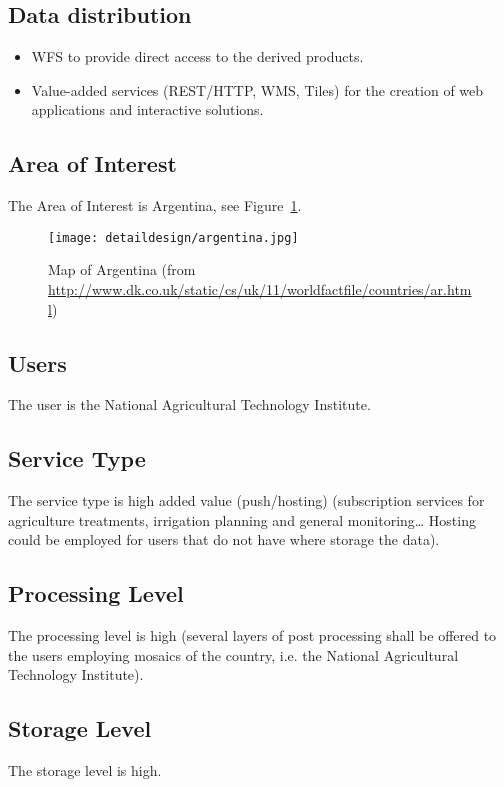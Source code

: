 \subsection{Data distribution}
\begin{itemize}
\item \ac{WFS} to provide direct access to the derived products.
\item Value-added services (REST/HTTP, WMS, Tiles) for the creation of web
  applications and interactive solutions. 
\end{itemize}

\subsection{Area of Interest} 
The Area of Interest is Argentina, see Figure~\ref{fig:argentina}.

  \begin{figure}[!h]
\begin{center}
\texttt{[image: detaildesign/argentina.jpg]}
\caption[Map of Argentina]{Map of Argentina (from \url{http://www.dk.co.uk/static/cs/uk/11/worldfactfile/countries/ar.html})}
\label{fig:argentina}
\end{center}
\end{figure}

\subsection{Users}
The user is the National Agricultural Technology Institute.
\subsection{Service Type}
The service type is high added value (push/hosting) (subscription services for agriculture treatments, irrigation planning and general monitoring… Hosting could be employed for users that do not have where storage the data).
\subsection{Processing Level}
The processing level is high (several layers of post processing shall be offered to the users employing mosaics of the country, i.e. the National Agricultural Technology Institute).
\subsection{Storage Level}
The storage level is high. 
